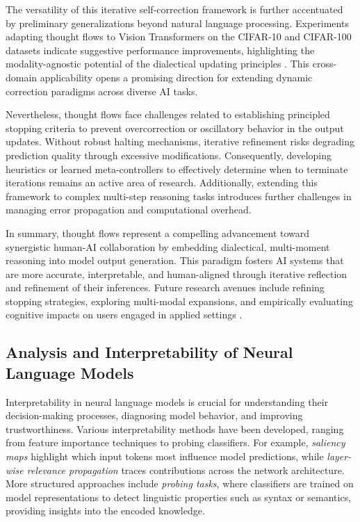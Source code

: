 \documentclass[sigconf]{acmart}
\begin{document}
The versatility of this iterative self-correction framework is further accentuated by preliminary generalizations beyond natural language processing. Experiments adapting thought flows to Vision Transformers on the CIFAR-10 and CIFAR-100 datasets indicate suggestive performance improvements, highlighting the modality-agnostic potential of the dialectical updating principles \cite{ref43}. This cross-domain applicability opens a promising direction for extending dynamic correction paradigms across diverse AI tasks.

Nevertheless, thought flows face challenges related to establishing principled stopping criteria to prevent overcorrection or oscillatory behavior in the output updates. Without robust halting mechanisms, iterative refinement risks degrading prediction quality through excessive modifications. Consequently, developing heuristics or learned meta-controllers to effectively determine when to terminate iterations remains an active area of research. Additionally, extending this framework to complex multi-step reasoning tasks introduces further challenges in managing error propagation and computational overhead.

In summary, thought flows represent a compelling advancement toward synergistic human-AI collaboration by embedding dialectical, multi-moment reasoning into model output generation. This paradigm fosters AI systems that are more accurate, interpretable, and human-aligned through iterative reflection and refinement of their inferences. Future research avenues include refining stopping strategies, exploring multi-modal expansions, and empirically evaluating cognitive impacts on users engaged in applied settings \cite{ref43}.

\subsection{Analysis and Interpretability of Neural Language Models}

Interpretability in neural language models is crucial for understanding their decision-making processes, diagnosing model behavior, and improving trustworthiness. Various interpretability methods have been developed, ranging from feature importance techniques to probing classifiers. For example, \emph{saliency maps} highlight which input tokens most influence model predictions, while \emph{layer-wise relevance propagation} traces contributions across the network architecture. More structured approaches include \emph{probing tasks}, where classifiers are trained on model representations to detect linguistic properties such as syntax or semantics, providing insights into the encoded knowledge.
\end{document}
